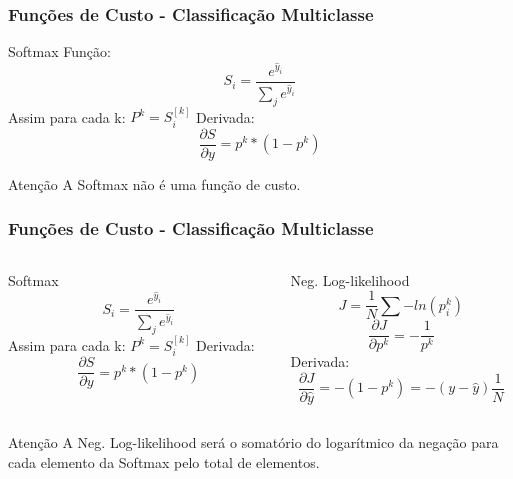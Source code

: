 \documentclass{beamer}
\begin{document}
\begin{frame}
	\frametitle{Funções de Custo - Classificação Multiclasse}
	\begin{block}{Softmax}
		Função:
		$$S_i = \frac{e^{\hat{y}_i}}{\sum_j e^{\hat{y}_i}} $$
		Assim para cada k: $P^k = S_i^{[k]}$
		Derivada: 	$$\frac{\partial S}{\partial y} = p^k * (1-p^k)$$
	\end{block}
	\begin{alertblock}{Atenção}
		A Softmax não é uma função de custo.
	\end{alertblock}
\end{frame}
\begin{frame}
	\frametitle{Funções de Custo - Classificação Multiclasse}
	
	\begin{columns}
		\begin{column}{0.4 \textwidth}
		\begin{block}{Softmax}
			$$S_i = \frac{e^{\hat{y}_i}}{\sum_j e^{\hat{y}_i}} $$
			Assim para cada k: $P^k = S_i^{[k]}$
			Derivada: 	$$\frac{\partial S}{\partial y} = p^k * (1-p^k)$$
		\end{block}
		\end{column}
		\begin{column}{0.4 \textwidth}
		\begin{block}{Neg. Log-likelihood}
			$$J = \frac{1}{N} \sum -ln(p_i^k) $$
			 $$\frac{\partial J}{\partial p^k} = - \frac{1}{p^k}$$
			Derivada: 	$$\frac{\partial J}{\partial \hat{y}} = -(1-p^k) = -(y-\hat{y}) \frac{1}{N}$$
		\end{block}
		\end{column}
	\end{columns}
	\begin{alertblock}{Atenção}
		A Neg. Log-likelihood será o somatório do logarítmico  da negação para cada elemento da Softmax pelo total de elementos.
	\end{alertblock}
\end{frame}
\end{document}
